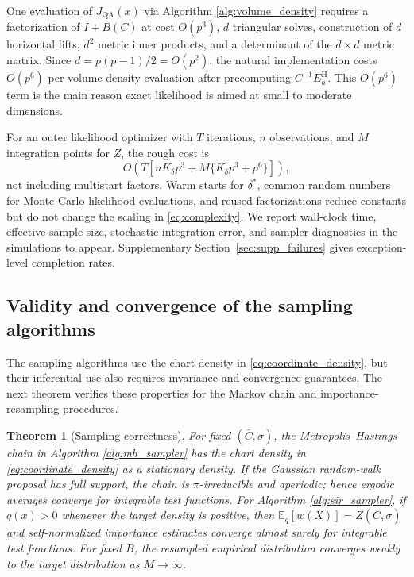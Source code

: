 \documentclass[
  12pt]{article}
\newcommand{\E}{\mathbb E}
\newcommand{\QA}{\mathrm{QA}}
\newtheorem{theorem}{Theorem}
\begin{document}
One evaluation of $J_{\QA}(x)$ via Algorithm \ref{alg:volume_density} requires a factorization of $I+B(C)$ at cost $O(p^3)$, $d$ triangular solves, construction of $d$ horizontal lifts, $d^2$ metric inner products, and a determinant of the $d\times d$ metric matrix. Since $d=p(p-1)/2=O(p^2)$, the natural implementation costs $O(p^6)$ per volume-density evaluation after precomputing $C^{-1}E_a^{\mathrm H}$. This $O(p^6)$ term is the main reason exact likelihood is aimed at small to moderate dimensions.

For an outer likelihood optimizer with $T$ iterations, $n$ observations, and $M$ integration points for $Z$, the rough cost is
\begin{equation}\label{eq:complexity}
O\left(T\left[nK_{\delta}p^3+M\{K_{\delta}p^3+p^6\}\right]\right),
\end{equation}
not including multistart factors. Warm starts for $\delta^*$, common random numbers for Monte Carlo likelihood evaluations, and reused factorizations reduce constants but do not change the scaling in \eqref{eq:complexity}. We report wall-clock time, effective sample size, stochastic integration error, and sampler diagnostics in the simulations to appear. Supplementary Section~\ref{sec:supp_failures} gives exception-level completion rates. 

\subsection{Validity and convergence of the sampling algorithms}\label{sec:sampler_correctness}

The sampling algorithms use the chart density in \eqref{eq:coordinate_density}, but their inferential use also requires invariance and convergence guarantees. The next theorem verifies these properties for the Markov chain and importance-resampling procedures.

\begin{theorem}[Sampling correctness]\label{thm:sampler_correctness}
For fixed $(\bar C,\sigma)$, the Metropolis--Hastings chain in Algorithm \ref{alg:mh_sampler} has the chart density in \eqref{eq:coordinate_density} as a stationary density. If the Gaussian random-walk proposal has full support, the chain is $\pi$-irreducible and aperiodic; hence ergodic averages converge for integrable test functions. For Algorithm \ref{alg:sir_sampler}, if $q(x)>0$ whenever the target density is positive, then $\E_q[w(X)]=Z(\bar C,\sigma)$ and self-normalized importance estimates converge almost surely for integrable test functions. For fixed $B$, the resampled empirical distribution converges weakly to the target distribution as $M\to\infty$.
\end{theorem}
\end{document}
